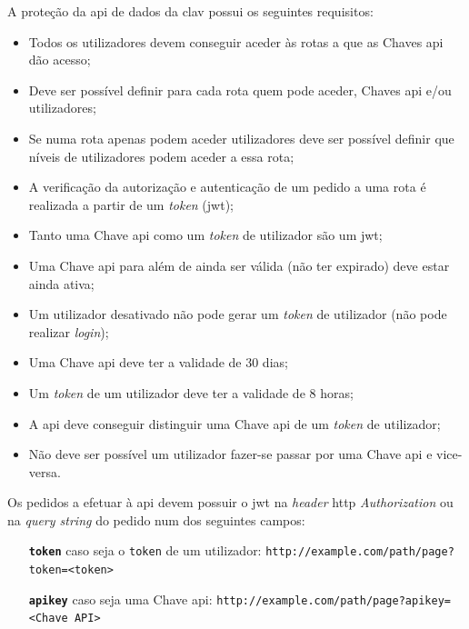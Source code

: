 A proteção da \acrshort{api} de dados da \acrshort{clav} possui os seguintes requisitos:
\begin{itemize}
    \item Todos os utilizadores devem conseguir aceder às rotas a que as Chaves \acrshort{api} dão acesso;
    \item Deve ser possível definir para cada rota quem pode aceder, Chaves \acrshort{api} e/ou utilizadores;
    \item Se numa rota apenas podem aceder utilizadores deve ser possível definir que níveis de utilizadores 
    podem aceder a essa rota;
    \item A verificação da autorização e autenticação de um pedido a uma rota é realizada a partir de um 
    \textit{token} (\acrshort{jwt});
    \item Tanto uma Chave \acrshort{api} como um \textit{token} de utilizador são um \acrshort{jwt};
    \item Uma Chave \acrshort{api} para além de ainda ser válida (não ter expirado) deve estar ainda ativa;
    \item Um utilizador desativado não pode gerar um \textit{token} de utilizador (não pode realizar 
    \textit{login});
    \item Uma Chave \acrshort{api} deve ter a validade de 30 dias;
    \item Um \textit{token} de um utilizador deve ter a validade de 8 horas;
    \item A \acrshort{api} deve conseguir distinguir uma Chave \acrshort{api} de um \textit{token} de utilizador;
    \item Não deve ser possível um utilizador fazer-se passar por uma Chave \acrshort{api} e vice-versa.
\end{itemize}

Os pedidos a efetuar à \acrshort{api} devem possuir o \acrshort{jwt} na \textit{header} 
\acrshort{http} \textit{Authorization} ou na \textit{query string} do pedido num dos seguintes campos:
\begin{itemize}[leftmargin=3cm]
    \item[\textbf{\texttt{token}}] caso seja o \texttt{token} de um utilizador:\newline
        \verb|http://example.com/path/page?token=<token>|
    \item[\textbf{\texttt{apikey}}] caso seja uma Chave \acrshort{api}:\newline
        \verb|http://example.com/path/page?apikey=<Chave API>|
\end{itemize}

